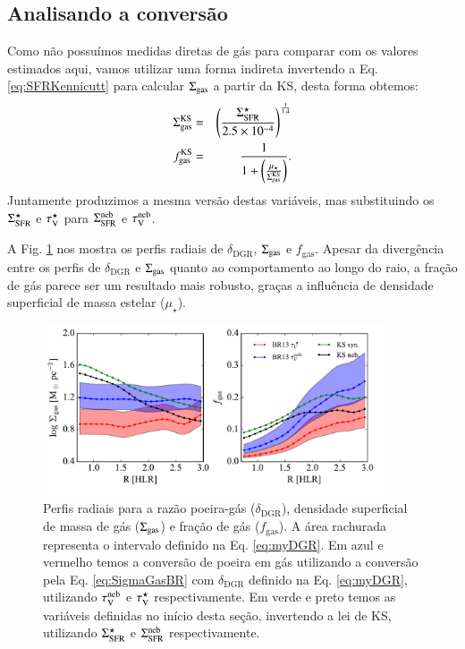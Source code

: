 \subsection{Analisando a conversão}
\label{sec:gasfrac:gas2dust:analisradperf}

Como não possuímos medidas diretas de gás para comparar com os valores estimados aqui, vamos
utilizar uma forma indireta invertendo a Eq. \ref{eq:SFRKennicutt} para calcular $\SigmaGas$ a
partir da KS, desta forma obtemos:
\begin{eqnarray}
	\Sigma_{\mathrm{gas}}^{\mathrm{KS}} &=& \left(\frac{\Sigma_{\mathrm{SFR}}^\star}{2.5 \times 10^{-4}}\right)^{\frac{1}{1.4}} \\
	\label{eq:SigmaGasKenn}
	f_{\mathrm{gas}}^{\mathrm{KS}} &=& \frac{1}{1 +
	\left(\frac{\mu_\star}{\Sigma_{\mathrm{gas}}^{\mathrm{KS}}}\right)}.
	\label{eq:fGasKenn}
\end{eqnarray}
\noindent Juntamente produzimos a mesma versão destas variáveis, mas substituindo os $\Sigma_{\mathrm{SFR}}^\star$
e $\tau_{\mathrm{V}}^\star$ para $\Sigma_{\mathrm{SFR}}^{\mathrm{neb}}$ e $\tau_{\mathrm{V}}^{\mathrm{neb}}$.

A Fig. \ref{fig:propsGasR} nos mostra os perfis radiais de $\delta_{\mathrm{DGR}}$, $\SigmaGas$ e
$f_{\mathrm{gas}}$. Apesar da divergência entre os perfis de $\delta_{\mathrm{DGR}}$ e $\SigmaGas$
quanto ao comportamento ao longo do raio, a fração de gás parece ser um resultado mais robusto,
graças a influência de densidade superficial de massa estelar ($\mu_\star$).

\begin{figure}
	\centering
	\includegraphics[width=0.9\textwidth]{figuras/gas_R.pdf}
	\caption[Perfis radiais de $\SigmaGas$ e $f_{\mathrm{gas}}$.]
	{Perfis radiais para a razão poeira-gás ($\delta_{\mathrm{DGR}}$), densidade superficial de massa
de gás ($\SigmaGas$) e fração de gás ($f_{\mathrm{gas}}$). A área rachurada representa o intervalo
definido na Eq. \ref{eq:myDGR}. Em azul e vermelho temos a conversão de poeira em gás utilizando a
conversão pela Eq. \ref{eq:SigmaGasBR} com $\delta_{\mathrm{DGR}}$ definido na Eq. \ref{eq:myDGR},
utilizando $\tau_{\mathrm{V}}^{\mathrm{neb}}$ e $\tau_{\mathrm{V}}^\star$ respectivamente. Em verde e preto temos as variáveis definidas no
início desta seção, invertendo a lei de KS, utilizando $\Sigma_{\mathrm{SFR}}^\star$ e $\Sigma_{\mathrm{SFR}}^{\mathrm{neb}}$ respectivamente.}
	\label{fig:propsGasR}
\end{figure}

